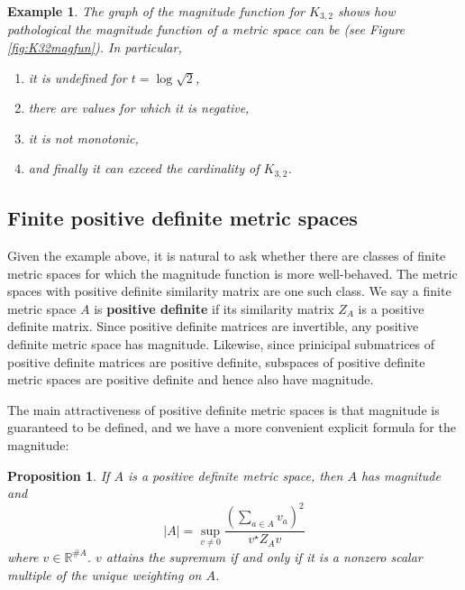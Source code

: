 \documentclass[11pt]{article}
\theoremstyle{mythm}
\newtheorem{ex}[defn]{Example}
\newtheorem{prop}[defn]{Proposition}
\begin{document}
\begin{ex}
The graph of the magnitude function for $K_{3,2}$ shows how pathological the magnitude function of a metric space can be (see Figure \ref{fig:K32magfun}). In particular,
\begin{enumerate}[label=\arabic*.]
\item it is undefined for $t = \log{\sqrt{2}}$,
\item there are values for which it is negative,
\item it is not monotonic,
\item and finally it can exceed the cardinality of $K_{3,2}$.
\end{enumerate}
\end{ex}

\subsection{Finite positive definite metric spaces}

Given the example above, it is natural to ask whether there are classes of finite metric spaces for which the magnitude function is more well-behaved. The metric spaces with positive definite similarity matrix are one such class. We say a finite metric space $A$ is \textbf{positive definite} if its similarity matrix $Z_A$ is a positive definite matrix. Since positive definite matrices are invertible, any positive definite metric space has magnitude. Likewise, since prinicipal submatrices of positive definite matrices are positive definite, subspaces of positive definite metric spaces are positive definite and hence also have magnitude.

The main attractiveness of positive definite metric spaces is that magnitude is guaranteed to be defined, and we have a more convenient explicit formula for the magnitude:

\begin{prop}\label{prop:finiteposdefsup}
If $A$ is a positive definite metric space, then $A$ has magnitude and
\begin{equation*}
\vert A \vert = \sup\limits_{v \neq 0}\frac{\left(\sum_{a\in A}v_a\right)^2}{v^\star Z_Av}
\end{equation*}
where $v \in \mathbb{R}^{\#A}$. $v$ attains the supremum if and only if it is a nonzero scalar multiple of the unique weighting on $A$.
\end{prop}
\end{document}
